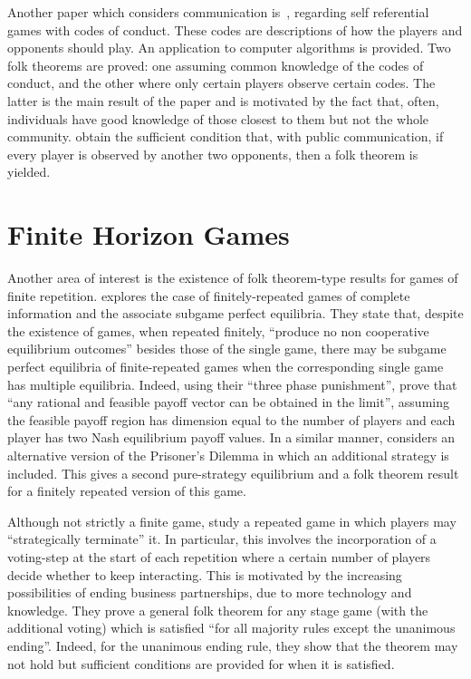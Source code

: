Another paper which considers communication is~\cite{Block2016}, regarding self
referential games with codes of conduct. These codes are descriptions of how the
players and opponents should play. An application to computer algorithms is
provided. Two folk theorems are proved: one assuming common knowledge of the
codes of conduct, and the other where only certain players observe certain
codes. The latter is the main result of the paper and is motivated by the fact
that, often, individuals have good knowledge of those closest to them but not
the whole community. \cite{Block2016} obtain the sufficient condition that, with
public communication, if every player is observed by another two opponents, then
a folk theorem is yielded.


\section{Finite Horizon Games}\label{sec:Finite_Horizon_Games}
Another area of interest is the existence of folk theorem-type results for games
of finite repetition. \cite{Benoit_1985} explores the case of finitely-repeated
games of complete information and the associate subgame perfect equilibria. They
state that, despite the existence of games, when repeated finitely, ``produce no
non cooperative equilibrium outcomes'' besides those of the single game, there
may be subgame perfect equilibria of finite-repeated games when the
corresponding single game has multiple equilibria. Indeed, using their ``three
phase punishment'', \cite{Benoit_1985} prove that ``any rational and feasible
payoff vector can be obtained in the limit'', assuming the feasible payoff
region has dimension equal to the number of players and each player has two Nash
equilibrium payoff values. In a similar manner, \cite{ANGELOVA2011} considers an
alternative version of the Prisoner's Dilemma in which an additional strategy is
included. This gives a second pure-strategy equilibrium and a folk theorem
result for a finitely repeated version of this game. 

Although not strictly a finite game, \cite{Fujiwara-Greve2018} study a repeated
game in which players may ``strategically terminate'' it. In particular, this
involves the incorporation of a voting-step at the start of each repetition
where a certain number of players decide whether to keep interacting. This is
motivated by the increasing possibilities of ending business partnerships, due
to more technology and knowledge. They prove a general folk theorem for any
stage game (with the additional voting) which is satisfied ``for all majority
rules except the unanimous ending''. Indeed, for the unanimous ending rule, they
show that the theorem may not hold but sufficient conditions are
provided for when it is satisfied.

